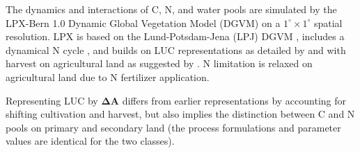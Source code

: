 The dynamics and interactions of C, N, and water pools are simulated by the LPX-Bern 1.0 Dynamic Global Vegetation Model (DGVM) \citep{spahni12cpd, stocker13natcc} on a $1^\circ \times 1^\circ$ spatial resolution. LPX is based on the Lund-Potsdam-Jena (LPJ) DGVM \citep{sitch03gcb}, includes a dynamical N cycle \citep{xuri08gcb}, and builds on LUC representations as detailed by \citet{strassmann08tel} and \citet{stocker11bg} with harvest on agricultural land as suggested by \citet{shevliakova09gbc}. N limitation is relaxed on agricultural land due to N fertilizer application.

Representing LUC by $\mathbf{\Delta A}$ differs from earlier representations \citep{strassmann08tel, stocker11bg} by accounting for shifting cultivation and harvest, but also implies the distinction between C and N pools on primary and secondary land (the process formulations and parameter values are identical for the two classes).

